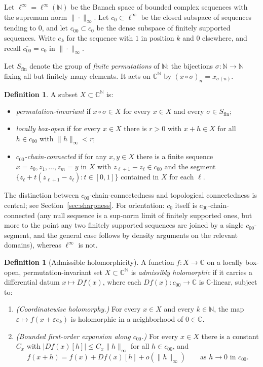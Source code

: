 \documentclass[11pt]{amsart}
\newcommand{\NN}{\mathbb{N}}
\newcommand{\CC}{\mathbb{C}}
\newcommand{\Sfin}{S_{\mathrm{fin}}}
\newcommand{\cc}{c_{00}}
\newcommand{\czero}{c_{0}}
\theoremstyle{plain}
\theoremstyle{definition}
\newtheorem{definition}[theorem]{Definition}
\theoremstyle{remark}
\begin{document}
Let $\ell^\infty=\ell^\infty(\NN)$ be the Banach space of bounded complex
sequences with the supremum norm $\|\cdot\|_\infty$. Let $\czero\subset
\ell^\infty$ be the closed subspace of sequences tending to $0$, and let
$\cc\subset\czero$ be the dense subspace of finitely supported sequences.
Write $e_k$ for the sequence with $1$ in position $k$ and $0$ elsewhere,
and recall $\overline{\cc}=\czero$ in $\|\cdot\|_\infty$.

Let $\Sfin$ denote the group of \emph{finite permutations} of $\NN$: the
bijections $\sigma:\NN\to\NN$ fixing all but finitely many elements. It
acts on $\CC^\NN$ by $(x\circ\sigma)_n=x_{\sigma(n)}$.

\begin{definition}
\label{def:domain}
A subset $X\subset\CC^\NN$ is:
\begin{itemize}[leftmargin=2em]
  \item \emph{permutation-invariant} if $x\circ\sigma\in X$ for every
        $x\in X$ and every $\sigma\in\Sfin$;
  \item \emph{locally box-open} if for every $x\in X$ there is $r>0$ with
        $x+h\in X$ for all $h\in\cc$ with $\|h\|_\infty<r$;
  \item \emph{$\cc$-chain-connected} if for any $x,y\in X$ there is a finite
        sequence $x=z_0,z_1,\ldots,z_m=y$ in $X$ with $z_{\ell+1}-z_\ell\in
        \cc$ and the segment $\{z_\ell+t(z_{\ell+1}-z_\ell):t\in[0,1]\}$
        contained in $X$ for each $\ell$.
\end{itemize}
\end{definition}

The distinction between $\cc$-chain-connectedness and topological
connectedness is central; see Section~\ref{sec:sharpness}. For orientation:
$\czero$ itself is $\cc$-chain-connected (any null sequence is a
sup-norm limit of finitely supported ones, but more to the point any two
finitely supported sequences are joined by a single $\cc$-segment, and the
general case follows by density arguments on the relevant domains), whereas
$\ell^\infty$ is not.

\begin{definition}[Admissible holomorphicity]
\label{def:holomorphic}
A function $f:X\to\CC$ on a locally box-open, permutation-invariant set
$X\subset\CC^\NN$ is \emph{admissibly holomorphic} if it carries a
differential datum $x\mapsto Df(x)$, where each $Df(x):\cc\to\CC$ is
$\CC$-linear, subject to:
\begin{enumerate}[label=\textup{(\roman*)}, leftmargin=2.8em]
\item \emph{(Coordinatewise holomorphy.)} For every $x\in X$ and every
      $k\in\NN$, the map $\varepsilon\mapsto f(x+\varepsilon e_k)$ is
      holomorphic in a neighborhood of $0\in\CC$.
\item \emph{(Bounded first-order expansion along $\cc$.)} For every $x\in
      X$ there is a constant $C_x$ with $|Df(x)[h]|\le C_x\|h\|_\infty$ for
      all $h\in\cc$, and
      \[
        f(x+h)=f(x)+Df(x)[h]+o(\|h\|_\infty)
        \qquad\text{as }h\to 0\text{ in }\cc.
      \]
\end{enumerate}
\end{definition}
\end{document}
